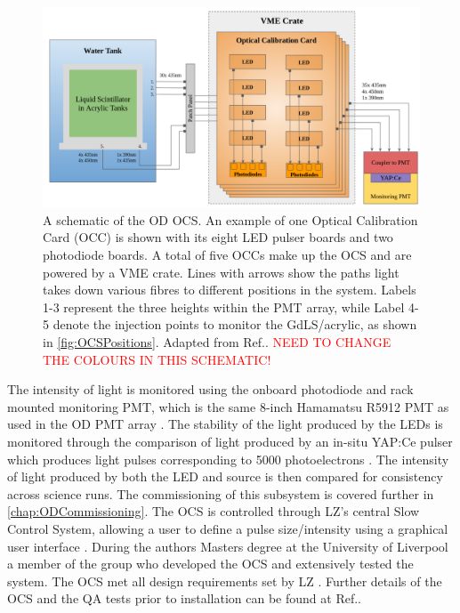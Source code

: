 \begin{figure}[h!]
    \centering
    \includegraphics[width=\linewidth]{figures/LZ/OCSSchematic_0.png}
    \caption{A schematic of the OD OCS. An example of one Optical Calibration Card (OCC) is shown with its eight LED pulser boards and two photodiode boards. A total of five OCCs make up the OCS and are powered by a VME crate. Lines with arrows show the paths light takes down various fibres to different positions in the system. Labels 1-3 represent the three heights within the PMT array, while Label 4-5 denote the injection points to monitor the GdLS/acrylic, as shown in \autoref{fig:OCSPositions}. Adapted from Ref.\cite{Turner:2021qvi,LZ:2024bsz}.
    \textcolor{red}{NEED TO CHANGE THE COLOURS IN THIS SCHEMATIC!}}
    \label{fig:OCSSchematic}
\end{figure}
The intensity of light is monitored using the onboard photodiode and rack mounted monitoring PMT, which is the same 8-inch Hamamatsu R5912 PMT as used in the OD PMT array \cite{Turner:2021qvi}. The stability of the light produced by the LEDs is monitored through the comparison of light produced by an in-situ YAP:Ce pulser which produces light pulses corresponding to 5000 photoelectrons \cite{Turner:2021qvi,KOBAYASHI1994355}. The intensity of light produced by both the LED and source is then compared for consistency across science runs. The commissioning of this subsystem is covered further in \autoref{chap:ODCommissioning}. The OCS is controlled through LZ's central Slow Control System, allowing a user to define a pulse size/intensity using a graphical user interface \cite{hbirch:thesis}.
During the authors Masters degree at the University of Liverpool a member of the group who developed the OCS and extensively tested the system. The OCS met all design requirements set by LZ \cite{Turner:2021qvi}. Further details of the OCS and the QA tests prior to installation can be found at Ref.\cite{hbirch:thesis,Turner:2021qvi}. 

